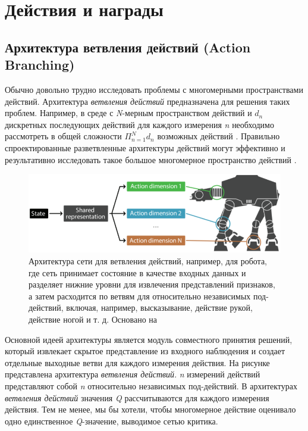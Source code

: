 \section{Действия и награды} \label{ch2:act-rew} %

\subsection{Архитектура ветвления действий (Action Branching)}

Обычно довольно трудно исследовать проблемы с многомерными пространствами действий. Архитектура \textit{ветвления действий} предназначена для решения таких проблем. Например, в среде с \textit{N}-мерным пространством действий и $d_n$ дискретных последующих действий для каждого измерения \textit{n} необходимо рассмотреть в общей сложности $\Pi^N_{n=1} d_n$ возможных действий \cite{tavakoli2017action}. Правильно спроектированные разветвленные архитектуры действий могут эффективно и результативно исследовать такое большое многомерное пространство действий \cite{tavakoli2017action}.

\begin{figure}[ht!]
    \center
    \includegraphics [scale=0.80] {my_folder/images/ch2/action-branching.png}
    \caption{Архитектура сети для ветвления действий, например, для робота, где сеть принимает состояние в качестве входных данных и разделяет нижние уровни для извлечения представлений признаков, а затем расходится по ветвям для относительно независимых под-действий, включая, например, высказывание, действие рукой, действие ногой и т. д. Основано на \cite{tavakoli2017action}}
    \label{fig:ch2-action-branching}
\end{figure} %

Основной идеей архитектуры является модуль совместного принятия решений, который извлекает скрытое представление из входного наблюдения и создает отдельные выходные ветви для каждого измерения действия. На рисунке  представлена архитектура \textit{ветвления действий}. \textit{n} измерений действий представляют собой \textit{n} относительно независимых под-действий.
В архитектурах \textit{ветвления действий} значения \textit{Q} рассчитываются для каждого измерения действия. Тем не менее, мы бы хотели, чтобы многомерное действие оценивало одно единственное \textit{Q}-значение, выводимое сетью критика.

